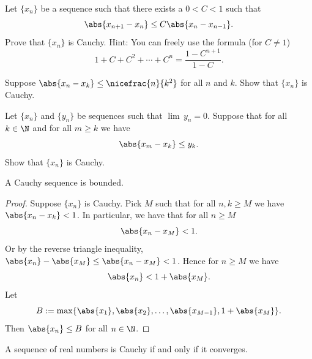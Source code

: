 \documentclass[12pt]{book}
\begin{document}
\begin{exercise}
Let $\{ x_n \}$ be a sequence such that
there exists a $0 < C < 1$ such that
\begin{equation*}
\abs{x_{n+1} - x_n} \leq C \abs{x_{n}-x_{n-1}} .
\end{equation*}
Prove that $\{ x_n \}$ is Cauchy.
Hint:  You can freely use the formula (for $C \not= 1$)
\begin{equation*}
1+ C+ C^2 + \cdots + C^n = \frac{1-C^{n+1}}{1-C}.
\end{equation*}
\end{exercise}

\begin{exercise}
Suppose $\abs{x_n-x_k} \leq \nicefrac{n}{k^2}$ for all $n$ and $k$.
Show that $\{ x_n \}$ is Cauchy.
\end{exercise}

\begin{exercise}
Let $\{ x_n \}$ and $\{ y_n \}$ be sequences such
that $\lim\, y_n =0$.
Suppose that for all $k \in \N$
and
for all $m \geq k$ we have
\begin{equation*}
\abs{x_m-x_k} \leq y_k .
\end{equation*}
Show that $\{ x_n \}$ is Cauchy.
\end{exercise}

\begin{prop}
A Cauchy sequence is bounded.
\end{prop}

\begin{proof}
Suppose $\{ x_n \}$ is Cauchy.
Pick $M$ such that for all
$n,k \geq M$ we have $\abs{x_n-x_k} < 1$.
In particular, we have
that for all $n \geq M$
\begin{equation*}
\abs{x_n - x_M} < 1 .
\end{equation*}
Or by the reverse triangle inequality,
$\abs{x_n} - \abs{x_M} \leq \abs{x_n - x_M} < 1$.
Hence for $n \geq M$
we have
\begin{equation*}
\abs{x_n} < 1 + \abs{x_M}.
\end{equation*}
Let
\begin{equation*}
B := \max \{ \abs{x_1}, \abs{x_2}, \ldots, \abs{x_{M-1}}, 1+ \abs{x_M} \} .
\end{equation*}
Then $\abs{x_n} \leq B$ for all $n \in \N$.
\end{proof}

\begin{thm}
A sequence of real numbers is Cauchy if and only if it converges.
\end{thm}
\end{document}
